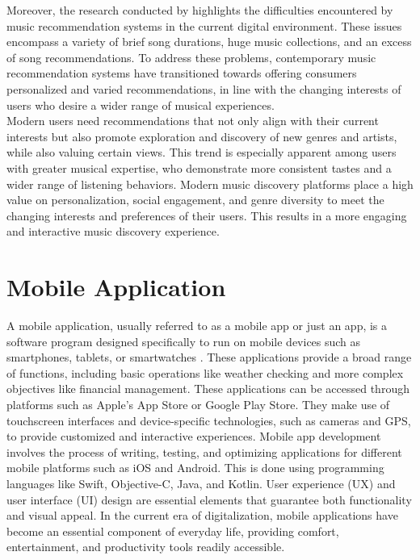 Moreover, the research conducted by \textcite{perera20} highlights the difficulties encountered by music recommendation systems in the current digital environment. These issues encompass a variety of brief song durations, huge music collections, and an excess of song recommendations. To address these problems, contemporary music recommendation systems have transitioned towards offering consumers personalized and varied recommendations, in line with the changing interests of users who desire a wider range of musical experiences. \\

Modern users need recommendations that not only align with their current interests but also promote exploration and discovery of new genres and artists, while also valuing certain views. This trend is especially apparent among users with greater musical expertise, who demonstrate more consistent tastes and a wider range of listening behaviors. Modern music discovery platforms place a high value on personalization, social engagement, and genre diversity to meet the changing interests and preferences of their users. This results in a more engaging and interactive music discovery experience. \pagebreak

\section{Mobile Application}
A mobile application, usually referred to as a mobile app or just an app, is a software program designed specifically to run on mobile devices such as smartphones, tablets, or smartwatches \parencite{ramdurai21}. These applications provide a broad range of functions, including basic operations like weather checking and more complex objectives like financial management. These applications can be accessed through platforms such as Apple's App Store or Google Play Store. They make use of touchscreen interfaces and device-specific technologies, such as cameras and GPS, to provide customized and interactive experiences. Mobile app development involves the process of writing, testing, and optimizing applications for different mobile platforms such as iOS and Android. This is done using programming languages like Swift, Objective-C, Java, and Kotlin. User experience (UX) and user interface (UI) design are essential elements that guarantee both functionality and visual appeal. In the current era of digitalization, mobile applications have become an essential component of everyday life, providing comfort, entertainment, and productivity tools readily accessible.

